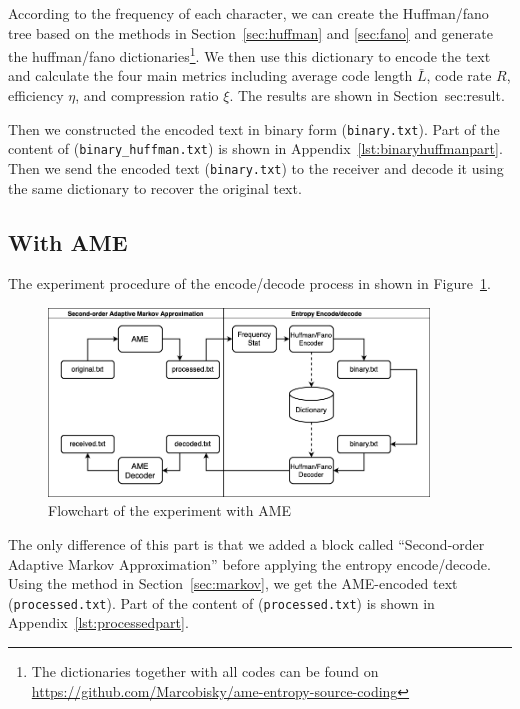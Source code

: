 \documentclass[12pt,twoside]{article}
\begin{document}
According to the frequency of each character, we can create the Huffman/fano tree based on the methods in Section~\ref{sec:huffman} and \ref{sec:fano} and generate the huffman/fano dictionaries\footnote{The dictionaries together with all codes can be found on \url{https://github.com/Marcobisky/ame-entropy-source-coding}}. We then use this dictionary to encode the text and calculate the four main metrics including average code length $\bar{L}$, code rate $R$, efficiency $\eta$, and compression ratio $\xi$. The results are shown in Section~{sec:result}. 

Then we constructed the encoded text in binary form (\texttt{binary.txt}). Part of the content of (\texttt{binary\_huffman.txt}) is shown in Appendix~\ref{lst:binaryhuffmanpart}. Then we send the encoded text (\texttt{binary.txt}) to the receiver and decode it using the same dictionary to recover the original text.



\subsection{With AME}

The experiment procedure of the encode/decode process in shown in Figure~\ref{fig:with-ame}.

\begin{figure}[h!]
    \centering
    \includegraphics[width=0.9\textwidth]{with-ame2.png}
    \caption{Flowchart of the experiment with AME}
    \label{fig:with-ame}
\end{figure}

The only difference of this part is that we added a block called ``Second-order Adaptive Markov Approximation'' before applying the entropy encode/decode. Using the method in Section~\ref{sec:markov}, we get the AME-encoded text (\texttt{processed.txt}). Part of the content of (\texttt{processed.txt}) is shown in Appendix~\ref{lst:processedpart}.
\end{document}
